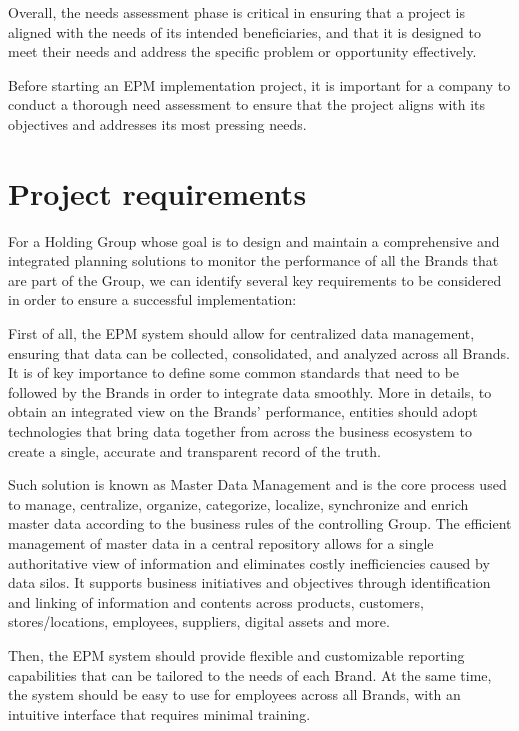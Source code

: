 \documentclass[12pt,a4paper,openright,twoside]{book}
\begin{document}
Overall, the needs assessment phase is critical in ensuring that a project is aligned with the needs of its intended beneficiaries, and that it is designed to meet their needs and address the specific problem or opportunity effectively.

Before starting an EPM implementation project, it is important for a company to conduct a thorough need assessment to ensure that the project aligns with its objectives and addresses its most pressing needs.

\section{Project requirements}

For a Holding Group whose goal is to design and maintain a comprehensive and integrated planning solutions to monitor the performance of all the Brands that are part of the Group, we can identify several key requirements to be considered in order to ensure a successful implementation:

First of all, the EPM system should allow for centralized data management, ensuring that data can be collected, consolidated, and analyzed across all Brands.
%
It is of key importance to define some common standards that need to be followed by the Brands in order to integrate data smoothly.
%
More in details, to obtain an integrated view on the Brands' performance, entities should adopt technologies that bring data together from across the business ecosystem to create a single, accurate and transparent record of the truth.

Such solution is known as Master Data Management and is the core process used to manage, centralize, organize, categorize, localize, synchronize and enrich master data according to the business rules of the controlling Group.
%
The efficient management of master data in a central repository allows for a single authoritative view of information and eliminates costly inefficiencies caused by data silos.
%
It supports business initiatives and objectives through identification and linking of information and contents across products, customers, stores/locations, employees, suppliers, digital assets and more.

Then, the EPM system should provide flexible and customizable reporting capabilities that can be tailored to the needs of each Brand.
%
At the same time, the system should be easy to use for employees across all Brands, with an intuitive interface that requires minimal training.
\end{document}
